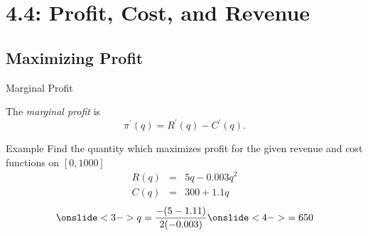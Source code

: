 \documentclass[Lecture.tex]{subfiles}
\begin{document}
\section{4.4: Profit, Cost, and Revenue}
\subsection{Maximizing Profit}

\begin{frame}{Marginal Profit}
  \begin{defn}
    The {\it marginal profit} is
    $$\pi^\prime(q) = R^\prime(q) - C^\prime(q).$$
  \end{defn}
  
\end{frame}

\begin{frame}{Example}
  Find the quantity which maximizes profit for the given revenue and cost functions on $[0,1000]$
  \begin{eqnarray*}
    R(q) &=& 5q - 0.003q^2\\
    C(q) &=& 300 + 1.1q
  \end{eqnarray*}
  $$\onslide<3->{q = \frac{-(5 - 1.11)}{2(-0.003)}} \onslide<4->{ = 650}$$
\end{frame}
\end{document}

